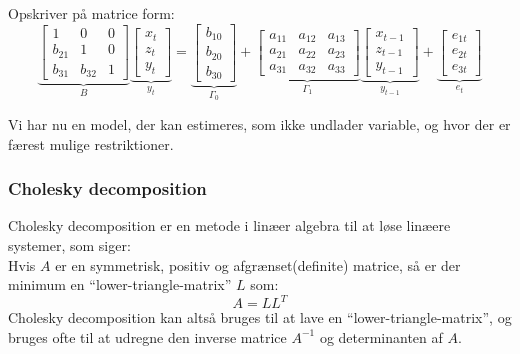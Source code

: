 \documentclass[
  10pt,
]{article}
\begin{document}
Opskriver på matrice form: \[ \underbrace{
\left[ \begin{array}{ccc}
1 & 0 & 0 \\
b_{21}  & 1 & 0 \\
b_{31}  & b_{32} & 1
\end{array} \right]
}_{B}
\underbrace{
\left[ \begin{array}{c}
x_{t} \\
z_{t} \\
y_{t} 
\end{array} \right]
}_{y_t}
=
\underbrace{
\left[ \begin{array}{c}
b_{10} \\
b_{20}  \\
b_{30}
\end{array} \right]
}_{\Gamma_0}  
+
\underbrace{
\left[ \begin{array}{ccc}
a_{11} & a_{12} & a_{13} \\
a_{21} & a_{22} & a_{23}\\
a_{31} & a_{32} & a_{33}
\end{array} \right]
}_{\Gamma_1}
\underbrace{
\left[ \begin{array}{c}
x_{t-1} \\
z_{t-1} \\
y_{t-1}
\end{array} \right]
 }_{y_{t-1}}
 + 
\underbrace{
\left[ \begin{array}{c}
e_{1 t} \\
e_{2t} \\
e_{3t}
\end{array} \right]
 }_{e_t} \]

Vi har nu en model, der kan estimeres, som ikke undlader variable, og
hvor der er færest mulige restriktioner.

\hypertarget{cholesky-decomposition}{%
\subsubsection{Cholesky decomposition}\label{cholesky-decomposition}}

Cholesky decomposition er en metode i linæer algebra til at løse linæere
systemer, som siger:\\
Hvis \(A\) er en symmetrisk, positiv og afgrænset(definite) matrice, så
er der minimum en ``lower-triangle-matrix'' \(L\) som: \[ A=LL^T\]
Cholesky decomposition kan altså bruges til at lave en
``lower-triangle-matrix'', og bruges ofte til at udregne den inverse
matrice \(A^{-1}\) og determinanten af \(A\).
\end{document}
